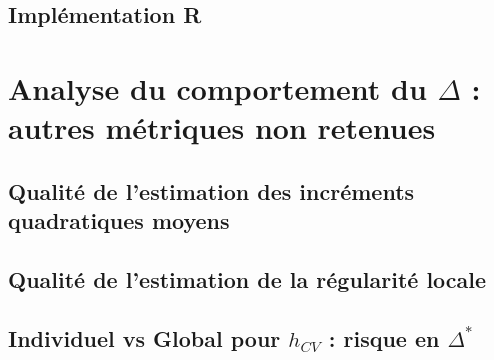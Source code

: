\pagebreak

\section{Implémentation R}
\label{annexe:code-R}



\chapter{
  Analyse du comportement du $\Delta$ : autres métriques non retenues
 }

\section{Qualité de l'estimation des incréments quadratiques moyens}


\section{Qualité de l'estimation de la régularité locale}


\section{Individuel vs Global pour $h_{CV}$ : risque en $\Delta^*$}
